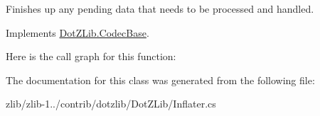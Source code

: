 Finishes up any pending data that needs to be processed and handled. 



Implements \hyperlink{class_dot_z_lib_1_1_codec_base_abab96cb01a9b983452a31777e3a1e633}{Dot\+Z\+Lib.\+Codec\+Base}.



Here is the call graph for this function\+:




The documentation for this class was generated from the following file\+:\begin{DoxyCompactItemize}
\item 
zlib/zlib-\/1../contrib/dotzlib/\+Dot\+Z\+Lib/Inflater.\+cs\end{DoxyCompactItemize}
